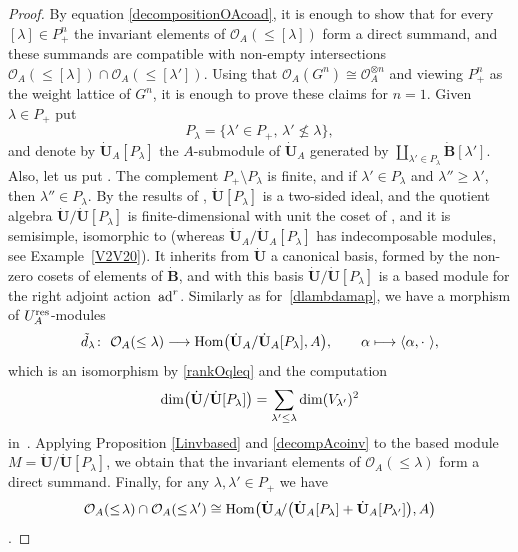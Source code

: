 \documentclass[10pt,a4paper]{amsart}
\numberwithin{equation}{section}
\theoremstyle{definition}
\newcommand{\mc}{\mathbb{C}}
\newcommand{\Oo}{{\mathcal O}}
\begin{document}
\begin{proof} By equation \eqref{decompositionOAcoad}, it is enough to show that for every $[\lambda]\in P_+^n$ the invariant elements of $\Oo_A(\leq [\lambda])$ form a direct summand, and these summands are compatible with non-empty intersections $\Oo_A(\leq [\lambda]) \cap \Oo_A(\leq [\lambda'])$. Using that $\Oo_A(G^n) \cong \Oo_A^{\otimes n}$ and viewing $P_+^n$ as the weight lattice of $G^n$, it is enough to prove these claims for $n=1$. Given $\lambda\in P_+$ put
\[P_{\lambda} = \{\lambda'\in P_+, \, \lambda' \nleqslant \lambda\},\]
and denote by $\dot{\mathbf{U}}_A [P_\lambda]$ the $A$-submodule of $\dot{\mathbf{U}}_A$ generated by $\coprod_{\lambda' \in P_\lambda} \dot{\mathbf{B}} [\lambda']$. Also, let us put \smash{$\dot{\mathbf{U}} [P_\lambda]= \dot{\mathbf{U}}_A [P_\lambda]\bigotimes_A \mc(q)$}.
The complement $P_+\setminus P_{\lambda}$ is finite, and if $\lambda'\in P_{\lambda}$ and $\lambda''\geq \lambda'$, then $\lambda''\in P_{\lambda}$. By the results of \cite[Section~29.2]{Lusztig}, $ \dot{\mathbf{U}} [P_\lambda]$ is a two-sided ideal, and the quotient algebra $\dot{\mathbf{U}} / \dot{\mathbf{U}} [P_\lambda]$ is finite-dimensional with unit the coset of , and it is semisimple, isomorphic to  (whereas $\dot{\mathbf{U}}_A / \dot{\mathbf{U}}_A [P_\lambda]$ has indecomposable modules, see Example~\ref{V2V20}).
It inherits from $\dot{\mathbf{U}}$ a canonical basis, formed by the non-zero cosets of elements of $\dot{\mathbf{B}}$, and with this basis $\dot{\mathbf{U}} / \dot{\mathbf{U}} [P_\lambda]$ is a based module for the right adjoint action~${\rm ad}^r$. Similarly as for~\eqref{dlambdamap}, we have a morphism of $U_A^{\rm res}$-modules
\[
\tilde{d}_\lambda\colon\ \Oo_A(\leq \lambda)\longrightarrow {\rm Hom} \big( \dot{\mathbf{U}}_A / \dot{\mathbf{U}}_A [P_\lambda],A\big),\qquad \alpha\longmapsto\langle \alpha , \cdot \ \rangle,\]
which is an isomorphism by \eqref{rankOqleq} and the computation \[ {\rm dim}\bigl(\dot{\mathbf{U}} / \dot{\mathbf{U}} [P_\lambda]\bigr) = \sum_{\lambda'\leq \lambda} {\rm dim}(V_{\lambda'})^2\] in~\cite[Section~29.2]{Lusztig}. Applying Proposition \ref{Linvbased} and \eqref{decompAcoinv} to the based module ${M=\dot{\mathbf{U}} / \dot{\mathbf{U}} [P_\lambda]}$, we obtain that the invariant elements of $\Oo_A(\leq \lambda)$ form a direct summand. Finally, for any ${\lambda,\lambda'\!\in\! P_+}$ we have \[\Oo_A(\leq \! \lambda) \cap \Oo_A(\leq \! \lambda')\cong {\rm Hom} \bigl( \dot{\mathbf{U}}_A \!/\bigl(\dot{\mathbf{U}}_A [P_\lambda]+ \dot{\mathbf{U}}_A [P_{\lambda'}]\bigr),A\bigr)\].

\end{proof}
\end{document}
